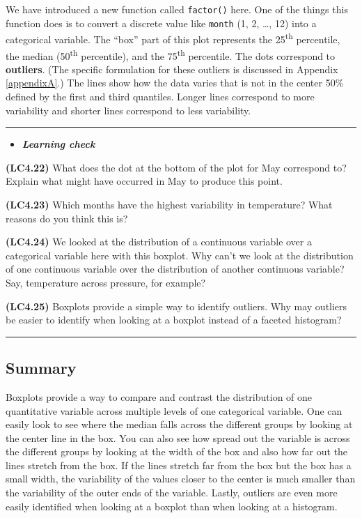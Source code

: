\documentclass[]{tufte-book}
\let\oldrule=\rule
\renewcommand{\rule}[1]{\oldrule{\linewidth}}
\newenvironment{rmdblock}[1]
  {\begin{shaded*}
  \begin{itemize}
  \renewcommand{\labelitemi}{
    \raisebox{-.7\height}[0pt][0pt]{
    }
  }
  \item
  }
  {
  \end{itemize}
  \end{shaded*}
  }
\newenvironment{learncheck}
  {\begin{rmdblock}{warning}}
  {\end{rmdblock}}
\begin{document}
We have introduced a new function called \texttt{factor()} here. One of
the things this function does is to convert a discrete value like
\texttt{month} (1, 2, \ldots{}, 12) into a categorical variable. The
``box'' part of this plot represents the 25\textsuperscript{th}
percentile, the median (50\textsuperscript{th} percentile), and the
75\textsuperscript{th} percentile. The dots correspond to
\textbf{outliers}. (The specific formulation for these outliers is
discussed in Appendix \ref{appendixA}.) The lines show how the data
varies that is not in the center 50\% defined by the first and third
quantiles. Longer lines correspond to more variability and shorter lines
correspond to less variability.

\begin{center}\rule{0.5\linewidth}{\linethickness}\end{center}

\begin{learncheck}
\textbf{\emph{Learning check}}
\end{learncheck}

\textbf{(LC4.22)} What does the dot at the bottom of the plot for May
correspond to? Explain what might have occurred in May to produce this
point.

\textbf{(LC4.23)} Which months have the highest variability in
temperature? What reasons do you think this is?

\textbf{(LC4.24)} We looked at the distribution of a continuous variable
over a categorical variable here with this boxplot. Why can't we look at
the distribution of one continuous variable over the distribution of
another continuous variable? Say, temperature across pressure, for
example?

\textbf{(LC4.25)} Boxplots provide a simple way to identify outliers.
Why may outliers be easier to identify when looking at a boxplot instead
of a faceted histogram?

\begin{center}\rule{0.5\linewidth}{\linethickness}\end{center}

\subsection{Summary}\label{summary-3}

Boxplots provide a way to compare and contrast the distribution of one
quantitative variable across multiple levels of one categorical
variable. One can easily look to see where the median falls across the
different groups by looking at the center line in the box. You can also
see how spread out the variable is across the different groups by
looking at the width of the box and also how far out the lines stretch
from the box. If the lines stretch far from the box but the box has a
small width, the variability of the values closer to the center is much
smaller than the variability of the outer ends of the variable. Lastly,
outliers are even more easily identified when looking at a boxplot than
when looking at a histogram.
\end{document}
